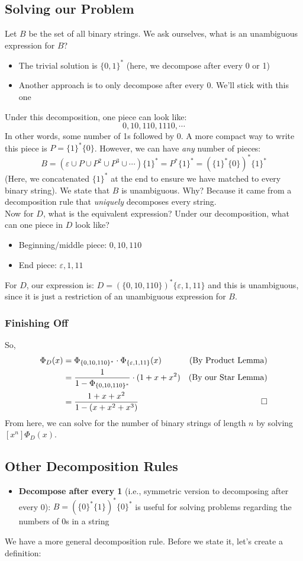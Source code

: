 \documentclass{report}
\begin{document}
\subsection{Solving our Problem}
Let $B$ be the set of all binary strings. We ask ourselves, what is an unambiguous expression for $B$?
\begin{itemize}
\item The trivial solution is $\{0,1\}^*$ (here, we decompose after every 0 or 1)
\item Another approach is to only decompose after every 0. We'll stick with this one
\end{itemize}
Under this decomposition, one piece can look like:
$$0, 10, 110, 1110, \cdots$$
In other words, some number of 1s followed by 0. A more compact way to write this piece is $P = \{1\}^*\{0\}$. However, we can have \textit{any} number of pieces:
$$B = (\varepsilon \cup P \cup P^2 \cup P^3 \cup \cdots )\{1\}^* = P^*\{1\}^* = {(\{1\}^*\{0\})}^*\{1\}^*$$
(Here, we concatenated $\{1\}^*$ at the end to ensure we have matched to every binary string). We state that $B$ is unambiguous. Why? Because it came from a decomposition rule that \textit{uniquely} decomposes every string.\\
Now for $D$, what is the equivalent expression? Under our decomposition, what can one piece in $D$ look like?
\begin{itemize}
\item Beginning/middle piece: $0, 10, 110$
\item End piece: $\varepsilon, 1, 11$
\end{itemize}
For $D$, our expression is:
$D = (\{0, 10, 110\})^*\{\varepsilon, 1, 11\}$
and this is unambiguous, since it is just a restriction of an unambiguous expression for $B$.\\
\subsubsection{Finishing Off}
So,
\begin{align*}
\Phi_D(x) &= \Phi_{\{0,10,110\}^*} \cdot \Phi_{\{\varepsilon, 1, 11\}} (x) & \text{(By Product Lemma)} \\
&= \frac{1}{1 - \Phi_{\{0,10,110\}^*}} \cdot (1 + x + x^2) & \text{(By our Star Lemma)} \\
&= \frac{1 + x + x^2}{1 - (x + x^2 + x^3)} & \qed
\end{align*}
From here, we can solve for the number of binary strings of length $n$ by solving $[x^n]\Phi_D(x)$.
\subsection{Other Decomposition Rules}
\begin{itemize}
\item \textbf{Decompose after every 1} (i.e., symmetric version to decomposing after every 0): $B = {(\{0\}^*\{1\})}^*\{0\}^*$ is useful for solving problems regarding the numbers of 0s in a string
\end{itemize}
We have a more general decomposition rule. Before we state it, let's create a definition:
\end{document}
